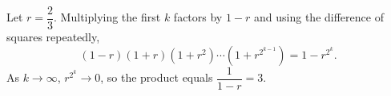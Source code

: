 Let $r=\dfrac{2}{3}$. Multiplying the first $k$ factors by $1-r$ and using the difference of squares repeatedly,
\[(1-r)(1+r)(1+r^2)\cdots\left(1+r^{2^{k-1}}\right)=1-r^{2^k}.\]
As $k\to\infty$, $r^{2^k}\to0$, so the product equals $\dfrac{1}{1-r}=\boxed{3}$.
